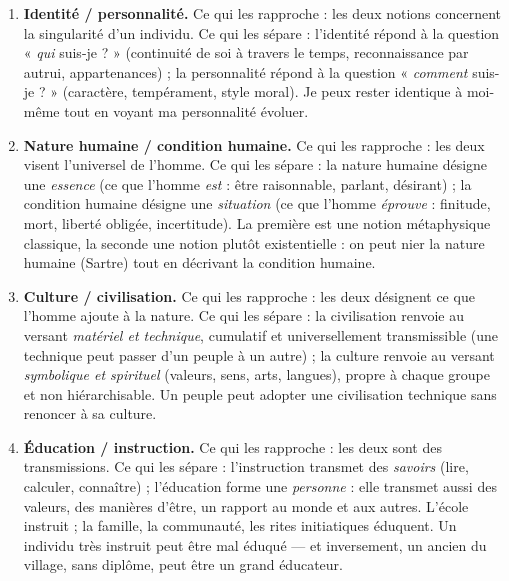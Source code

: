 \documentclass[11pt]{article}
\begin{document}
\begin{corrige}
\begin{enumerate}
\item \textbf{Identité / personnalité.} Ce qui les rapproche : les deux notions concernent la singularité d'un individu. Ce qui les sépare : l'identité répond à la question « \emph{qui} suis-je ? » (continuité de soi à travers le temps, reconnaissance par autrui, appartenances) ; la personnalité répond à la question « \emph{comment} suis-je ? » (caractère, tempérament, style moral). Je peux rester identique à moi-même tout en voyant ma personnalité évoluer.

\item \textbf{Nature humaine / condition humaine.} Ce qui les rapproche : les deux visent l'universel de l'homme. Ce qui les sépare : la nature humaine désigne une \emph{essence} (ce que l'homme \emph{est} : être raisonnable, parlant, désirant) ; la condition humaine désigne une \emph{situation} (ce que l'homme \emph{éprouve} : finitude, mort, liberté obligée, incertitude). La première est une notion métaphysique classique, la seconde une notion plutôt existentielle : on peut nier la nature humaine (Sartre) tout en décrivant la condition humaine.

\item \textbf{Culture / civilisation.} Ce qui les rapproche : les deux désignent ce que l'homme ajoute à la nature. Ce qui les sépare : la civilisation renvoie au versant \emph{matériel et technique}, cumulatif et universellement transmissible (une technique peut passer d'un peuple à un autre) ; la culture renvoie au versant \emph{symbolique et spirituel} (valeurs, sens, arts, langues), propre à chaque groupe et non hiérarchisable. Un peuple peut adopter une civilisation technique sans renoncer à sa culture.

\item \textbf{Éducation / instruction.} Ce qui les rapproche : les deux sont des transmissions. Ce qui les sépare : l'instruction transmet des \emph{savoirs} (lire, calculer, connaître) ; l'éducation forme une \emph{personne} : elle transmet aussi des valeurs, des manières d'être, un rapport au monde et aux autres. L'école instruit ; la famille, la communauté, les rites initiatiques éduquent. Un individu très instruit peut être mal éduqué — et inversement, un ancien du village, sans diplôme, peut être un grand éducateur.
\end{enumerate}
\end{corrige}
\end{document}
